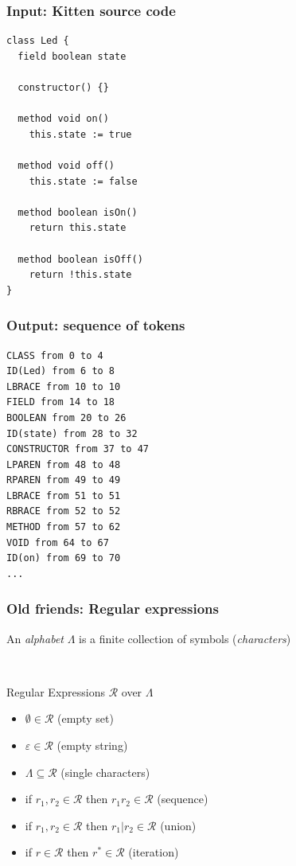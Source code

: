 \documentclass[11pt]{beamer}  %
\begin{document}
\begin{frame}[fragile]
\frametitle{Input: Kitten source code}

\vspace*{-2ex}
\begin{verbatim}
class Led {
  field boolean state
 
  constructor() {}

  method void on()
    this.state := true

  method void off()
    this.state := false

  method boolean isOn()
    return this.state

  method boolean isOff()
    return !this.state
}
\end{verbatim}

\end{frame}

\begin{frame}[fragile]
\frametitle{Output: sequence of tokens}

\begin{verbatim}
CLASS from 0 to 4
ID(Led) from 6 to 8
LBRACE from 10 to 10
FIELD from 14 to 18
BOOLEAN from 20 to 26
ID(state) from 28 to 32
CONSTRUCTOR from 37 to 47
LPAREN from 48 to 48
RPAREN from 49 to 49
LBRACE from 51 to 51
RBRACE from 52 to 52
METHOD from 57 to 62
VOID from 64 to 67
ID(on) from 69 to 70
...
\end{verbatim}

\end{frame}

\begin{frame}\frametitle{Old friends: Regular expressions}

\begin{greenbox}{}
An \emph{alphabet} $\Lambda$ is a finite collection of symbols (\emph{characters})
\end{greenbox}

\mbox{}\\

\begin{greenbox}{Regular Expressions $\mathcal{R}$ over $\Lambda$}
\begin{itemize}
\item $\emptyset\in\mathcal{R}$ (empty set)
\item $\varepsilon\in\mathcal{R}$ (empty string)
\item $\Lambda\subseteq\mathcal{R}$ (single characters)
\item if $r_1,r_2\in\mathcal{R}$ then $r_1r_2\in\mathcal{R}$ (sequence)
\item if $r_1,r_2\in\mathcal{R}$ then $r_1|r_2\in\mathcal{R}$ (union)
\item if $r\in\mathcal{R}$ then $r^*\in\mathcal{R}$ (iteration)
\end{itemize}

\end{greenbox}

\end{frame}
\end{document}
